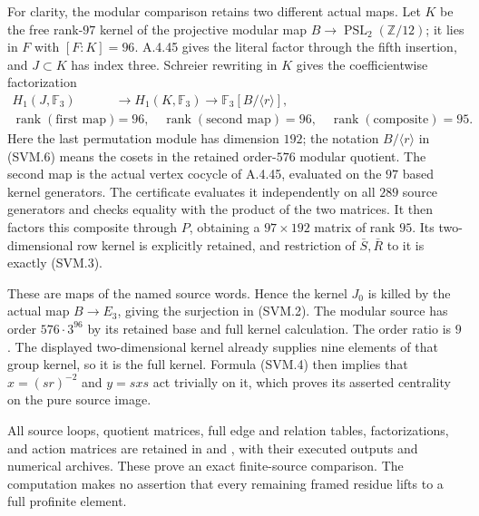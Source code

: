 For clarity, the modular comparison retains two different actual maps.
Let $K$ be the free rank-$97$ kernel of the projective modular map
$B\to\operatorname{PSL}_2(\mathbb Z/12)$; it lies in $F$ with
$[F:K]=96$.  A.4.45 gives the literal factor through the fifth
insertion, and $J\subset K$ has index three.  Schreier rewriting in
$K$ gives the coefficientwise factorization
\[
 \begin{split}
 H_1(J,\mathbb F_3)&\longrightarrow H_1(K,\mathbb F_3)
                 \longrightarrow \mathbb F_3[B/\langle r\rangle],\\
 \operatorname{rank}(\text{first map})&=96,\quad
 \operatorname{rank}(\text{second map})=96,\quad
 \operatorname{rank}(\text{composite})=95.
 \end{split}
                                                               \tag{SVM.6}
\]
Here the last permutation module has dimension $192$; the notation
$B/\langle r\rangle$ in (SVM.6) means the cosets in the retained
order-$576$ modular quotient.  The second map is the actual vertex
cocycle of A.4.45, evaluated on the $97$ based kernel generators.
The certificate evaluates it independently on all $289$ source
generators and checks equality with the product of the two matrices.
It then factors this composite through $P$, obtaining a
$97\times192$ matrix of rank $95$.  Its two-dimensional row kernel
is explicitly retained, and restriction of $\bar S,\bar R$ to it is
exactly (SVM.3).

These are maps of the named source words.  Hence the kernel $J_0$
is killed by the actual map $B\to E_3$, giving the surjection in
(SVM.2).  The modular source has order $576\cdot3^{96}$ by its
retained base and full kernel calculation.  The order ratio is $9$.
The displayed two-dimensional kernel already supplies nine elements
of that group kernel, so it is the full kernel.  Formula (SVM.4)
then implies that $x=(sr)^{-2}$ and $y=sxs$ act trivially on it,
which proves its asserted centrality on the pure source image.

All source loops, quotient matrices, full edge and relation tables,
factorizations, and action matrices are retained in
 and
, with their
executed outputs and numerical archives.  These prove an exact
finite-source comparison.  The computation makes no assertion that
every remaining framed residue lifts to a full profinite element.
